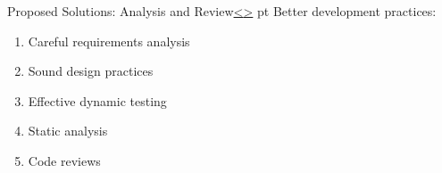 \documentclass[12pt]{extarticle}
\newenvironment{instructionblock}{\Large\bgroup}{\egroup}
\begin{document}



\pagebreak
\begin{slide}{Proposed Solutions: Analysis and Review}{\hyperref[slide 4]{\textless}\hyperref[slide 6]{\textgreater}}
	 pt
	\begin{instructionblock}
	Better development practices:
	
	\begin{enumerate}
		\item Careful requirements analysis
		\item Sound design practices
		\item Effective dynamic testing
		\item Static analysis
		\item Code reviews
	\end{enumerate}
	
	\end{instructionblock}
\end{slide}
\vfill
\end{document}
